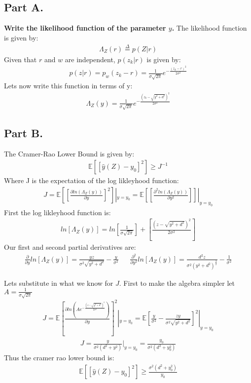 \documentclass{article}
\begin{document}
\subsection*{Part A.}
\textbf{Write the likelihood function of the parameter $y$.}
The likelihood function is given by:
\begin{align*}
\Lambda_Z(r) \overset{\Delta}{=} p(Z|r)
\end{align*}
Given that $r$ and $w$ are independent, $p(z_k|r)$ is given by:
\begin{align*}
p(z|r) = p_w(z_k-r) = \frac{1}{\sigma \sqrt{2\pi}} e^{-\tfrac{(z_k-r)^2}{2\sigma^2}}
\end{align*}
Lets now write this function in terms of y:
\begin{align*}
\Lambda_Z(y) = \frac{1}{\sigma \sqrt{2\pi}} e^{-\tfrac{(z_k-\sqrt{y^2+d^2})^2}{2\sigma^2}}
\end{align*}
\subsection*{Part B.}
The Cramer-Rao Lower Bound is given by:
\begin{align*}
\mathbb{E}[[\hat{y}(Z) - y_0]^2] \geq J^{-1}
\end{align*}
Where J is the expectation of the log likleyhood function:
\begin{align*}
J = \mathbb{E}[[\frac{\partial ln(\Lambda_Z(y))}{\partial y}]^2]|_{y=y_0} = \mathbb{E}[[\frac{\partial^2 ln(\Lambda_Z(y))}{\partial y^2}]]|_{y=y_0}
\end{align*}
First the log likleyhood function is:
\begin{align*}
ln[ \Lambda_Z(y)] =  ln[\frac{1}{\sigma \sqrt{2\pi}}] + [\tfrac{(z-\sqrt{y^2+d^2})^2}{2\sigma^2}]
\end{align*}
Our first and second partial derivatives are:
\begin{align*}
\frac{\partial}{\partial y}ln[ \Lambda_Z(y)] = \frac{yz}{\sigma^2 \sqrt{y^2+d^2}} - \frac{y}{\sigma^2} && \frac{\partial^2}{\partial y^2}ln[ \Lambda_Z(y)] = \frac{d^2 z}{\sigma^2 (y^2+d^2)^{\tfrac{3}{2}}} - \frac{1}{\sigma^2}
\end{align*}


Lets substitute in what we know for $J$. First to make the algebra simpler let $A = \frac{1}{\sigma \sqrt{2\pi}}$
\begin{align*}
J = \mathbb{E}[\frac{\partial ln(A e^{-\tfrac{(z-\sqrt{y^2+d^2})^2}{2\sigma^2}})}{\partial y}]^2|_{y=y_0} = \mathbb{E}[\frac{y}{\sigma^2} - \frac{z y}{\sigma^2 \sqrt{y^2+d^2}}]^2|_{y=y_0}
\end{align*}
\begin{align*}
J = \frac{y}{\sigma^2(d^2+y^2)}|_{y=y_0} = \frac{y_0}{\sigma^2 (d^2+y_0^2)}
\end{align*}
Thus the cramer rao lower bound is:
\begin{align*}
\boxed{ \mathbb{E}[[\hat{y}(Z) - y_0]^2] \geq \frac{\sigma^2 (d^2+y_0^2)}{y_0} }
\end{align*}
\end{document}

